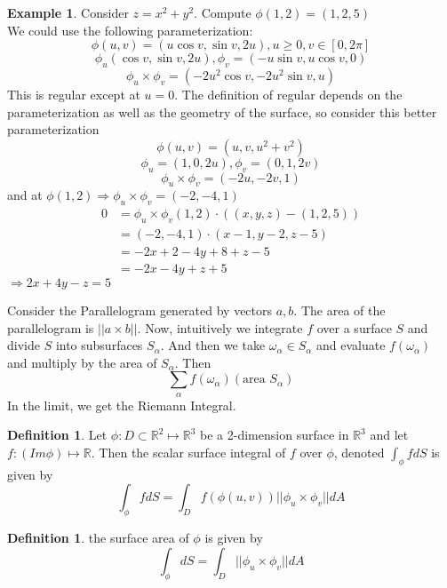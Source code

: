 \documentclass[12pt]{article}
\theoremstyle{plain}
\theoremstyle{definition}
\newtheorem{definition}[theorem]{Definition}
\newtheorem{example}[theorem]{Example}
\begin{document}
\begin{example}
	Consider $z=x^2 + y^2$. Compute $\phi (1,2) = (1,2,5)$\\
	We could use the following parameterization:\\
	$$\phi (u,v) = (u \cos v, \sin v, 2u), u \geq 0, v \in [0,2\pi]$$
	$$\phi_u (\cos v, \sin v, 2u), \phi_v = (-u \sin v, u \cos v, 0)$$
	$$\phi_u \times \phi_v = (-2u^2 \cos v, -2u^2 \sin v, u)$$
	This is regular except at $u=0$. The definition of regular depends on the parameterization as well as the geometry of the surface, so consider this better parameterization\\
	$$\phi (u,v) = (u,v,u^2 + v^2)$$
	$$\phi_u = (1,0,2u), \phi_v = (0,1,2v)$$
	$$\phi_u \times \phi_v = (-2u, -2v, 1)$$
	and at $\phi (1,2) \Longrightarrow \phi_u \times \phi_v = (-2,-4,1)$
	\begin{align*}
		0 &= \phi_u \times \phi_v (1,2) \cdot ((x,y,z) - (1,2,5))\\
		&= (-2,-4,1) \cdot (x-1, y-2, z-5)\\
		&= -2x + 2 - 4y + 8 +z -5\\
		&= -2x -4y + z +5
	\end{align*}
	$\Longrightarrow 2x+4y-z=5$
\end{example}

Consider the Parallelogram generated by vectors $a,b$. The area of the parallelogram is $||a \times b||$. Now, intuitively we integrate $f$ over a surface $S$ and divide $S$ into subsurfaces $S_\alpha$. And then we take $\omega_\alpha \in S_\alpha$ and evaluate $f(\omega_\alpha)$ and multiply by the area of $S_\alpha$. Then $$\sum_\alpha f(\omega_\alpha)(\text{area } S_\alpha)$$
In the limit, we get the Riemann Integral.

\begin{definition}
	Let $\phi : D \subset \mathbb{R}^2 \mapsto \mathbb{R}^3$ be a 2-dimension surface in $\mathbb{R}^3$ and let $f:(Im \phi)\mapsto \mathbb{R}$. Then the scalar surface integral of $f$ over $\phi$, denoted $\int_\phi f dS$ is given by
	$$\int_\phi f dS = \int_D f(\phi (u,v)) ||\phi_u \times \phi_v|| dA$$
\end{definition}

\begin{definition}
	the surface area of $\phi$ is given by
	$$\int_\phi dS = \int_D ||\phi_u \times \phi_v|| dA$$
\end{definition}
\end{document}

